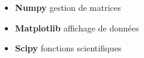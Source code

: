 
\begin{itemize}
	\item \textbf{Numpy} gestion de matrices
	\item \textbf{Matplotlib} affichage de données
	\item \textbf{Scipy} fonctions scientifiques
\end{itemize}